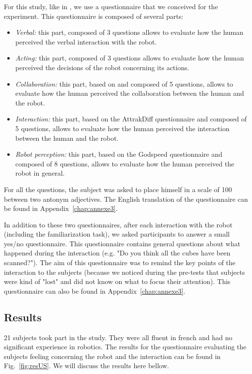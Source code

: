 \documentclass[english,a4paper,11pt,twoside]{StyleThese}
\begin{document}
For this study, like in \cite{heerink2010relating, fischer2016between}, we use a questionnaire that we conceived for the experiment. This questionnaire is composed of several parts:
\begin{itemize}
\item \textit{Verbal:} this part, composed of 3 questions allows to evaluate how the human perceived the verbal interaction with the robot.
\item \textit{Acting:} this part, composed of 3 questions allows to evaluate how the human perceived the decisions of the robot concerning its actions.
\item \textit{Collaboration:} this part, based on \cite{weistroffer2014etude} and composed of 5 questions, allows to evaluate how the human perceived the collaboration between the human and the robot.
\item \textit{Interaction:} this part, based on the AttrakDiff questionnaire \cite{lallemand2015creation} and composed of 5 questions, allows to evaluate how the human perceived the interaction between the human and the robot.
\item \textit{Robot perception:} this part, based on the Godspeed questionnaire \cite{bartneck2009measurement} and composed of 8 questions, allows to evaluate how the human perceived the robot in general.
\end{itemize}
For all the questions, the subject was asked to place himself in a scale of 100 between two antonym adjectives. The English translation of the questionnaire can be found in Appendix~\ref{chap:annexe3}.

In addition to these two questionnaires, after each interaction with the robot (including the familiarization task), we asked participants to answer a small yes/no questionnaire. This questionnaire contains general questions about what happened during the interaction (e.g. "Do you think all the cubes have been scanned?"). The aim of this questionnaire was to remind the key points of the interaction to the subjects (because we noticed during the pre-tests that subjects were kind of "lost" and did not know on what to focus their attention). This questionnaire can also be found in Appendix~\ref{chap:annexe3}.

\subsection{Results}

21 subjects took part in the study. They were all fluent in french and had no significant experience in robotics. The results for the questionnaire evaluating the subjects feeling concerning the robot and the interaction can be found in Fig.~\ref{fig:resUS}. We will discuss the results here bellow.
\end{document}
